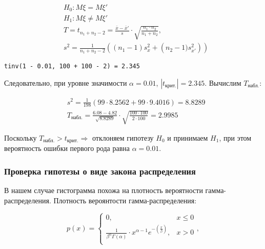 \documentclass{report}
\renewcommand {\le} {\leqslant}
\begin{document}
\begin{equation*}
\begin{split}
& H_0 : M\xi = M\xi' \\
& H_1 : M\xi \ne M\xi' \\
& T = t_{n_1 + n_2 - 2} = \frac{\bar x - \bar x'}{s} \cdot \sqrt{\frac{n_1 \cdot n_2}{n_1 + n_2}},\\
& s^2 = \frac{1}{n_1 + n_2 -2}\left( \left( n_1 - 1 \right) s^2_x + \left( n_2 - 1) s_{x'}^2\right)\right)
\end{split}
\end{equation*}

\begin{lstlisting}
tinv(1 - 0.01, 100 + 100 - 2) = 2.345
\end{lstlisting}

Следовательно, при уровне значимости $\alpha = 0.01$, $|t_{\text{крит.}}| = 2.345$. Вычислим $T_{\text{набл.}}$:

\begin{equation*}
\begin{split}
& s^2 = \frac{1}{198} \left( 99 \cdot 8.2562 + 99 \cdot 9.4016 \right) = 8.8289 \\
& T_{\text{набл.}} = \frac{6.08 - 4.82}{\sqrt{8.8289}} \cdot \sqrt{\frac{100 \cdot 100}{2 \cdot 100}}
  = 2.9985
\end{split}
\end{equation*}

Поскольку $T_{\text{набл.}} > t_{\text{крит.}} \Rightarrow$ отклоняем гипотезу $H_0$ и принимаем $H_1$, при этом вероятность ошибки первого рода равна $\alpha = 0.01$.

\newpage

\subsubsection*{Проверка гипотезы о виде закона распределения}

В нашем случае гистограмма похожа на плотность вероятности гамма-распределения. Плотность вероянтости гамма-распределения:

\begin{equation*}
p(x) = 
\begin {cases}
0, & x \le 0 \\
\frac{1}{\beta^\alpha \Gamma\left(\alpha\right)} \cdot x^{\alpha - 1} e^{-\left(\frac{x}{\beta}\right)}, & x > 0 \\
\end {cases},
\end{equation*}
\end{document}
